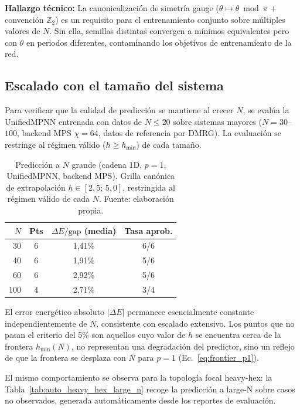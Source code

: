 \documentclass[11pt,a4paper,spanish]{book}
\begin{document}
\textbf{Hallazgo técnico:} La canonicalización de simetría gauge ($\theta \mapsto \theta \bmod \pi$ + convención $\mathbb{Z}_2$) es un requisito para el entrenamiento conjunto sobre múltiples valores de $N$. Sin ella, semillas distintas convergen a mínimos equivalentes pero con $\theta$ en periodos diferentes, contaminando los objetivos de entrenamiento de la red.

\subsection{Escalado con el tamaño del sistema}
\label{subsec:large_n_extrap}

Para verificar que la calidad de predicción se mantiene al crecer $N$, se evalúa la UnifiedMPNN entrenada con datos de $N \leq 20$ sobre sistemas mayores ($N = 30$--$100$, backend MPS $\chi = 64$, datos de referencia por DMRG). La evaluación se restringe al régimen válido ($h \geq h_{\min}$) de cada tamaño.

\begin{table}[h]
\centering
\caption[Predicción a $N$ grande (cadena 1D, $p = 1$)]{Predicción a $N$ grande (cadena 1D, $p = 1$, UnifiedMPNN, backend MPS). Grilla canónica de extrapolación $h \in [2{,}5;\, 5{,}0]$, restringida al régimen válido de cada $N$. Fuente: elaboración propia.}
\label{tab:large_n_chain}
\begin{tabular}{rccc}
\toprule
\textbf{$N$} & \textbf{Pts} & \textbf{$\Delta E/\text{gap}$ (media)} & \textbf{Tasa aprob.} \\
\midrule
30 & 6 & 1,41\% & 6/6 \\
40 & 6 & 1,91\% & 5/6 \\
60 & 6 & 2,92\% & 5/6 \\
100 & 4 & 2,71\% & 3/4 \\
\bottomrule
\end{tabular}
\end{table}

El error energético absoluto $|\Delta E|$ permanece esencialmente constante independientemente de $N$, consistente con escalado extensivo. Los puntos que no pasan el criterio del 5\% son aquellos cuyo valor de $h$ se encuentra cerca de la frontera $h_{\min}(N)$, no representan una degradación del predictor, sino un reflejo de que la frontera se desplaza con $N$ para $p = 1$ (Ec.~\ref{eq:frontier_p1}).

El mismo comportamiento se observa para la topología focal heavy-hex: la Tabla~\ref{tab:auto_heavy_hex_large_n} recoge la predicción a large-N sobre casos no observados, generada automáticamente desde los reportes de evaluación.
\end{document}
